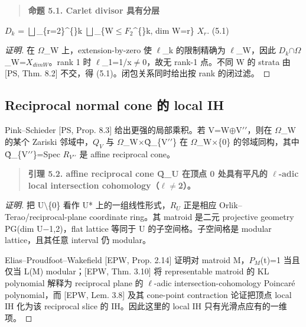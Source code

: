 \documentclass[11pt]{ctexart}
\begin{document}
\begin{quote}\textbf{命题 5.1. Carlet divisor 具有分层}\end{quote}

\ensuremath{D_{k}} = \ensuremath{\bigsqcup}\_\{r=2\}\textasciicircum\{\}k  \ensuremath{\bigsqcup}\_\{W\ensuremath{\le}\ensuremath{F_2}\textasciicircum\{\}k, dim W=r\} \ensuremath{X_{r}}.    (5.1)

\begin{proof}[证明] 

在 \ensuremath{\Omega}\_W 上，extension-by-zero 使 \ensuremath{\ell}\_k 的限制精确为 \ensuremath{\ell}\_W，因此 \ensuremath{D_{k}}\ensuremath{\cap}\ensuremath{\Omega}\_W=\ensuremath{X_{dim W}}。rank 1 时 \ensuremath{\ell}\_1=1/x\ensuremath{\ne}0，故无 rank-1 点。不同 W 的 strata 由 [PS, Thm. 8.2] 不交，得 (5.1)。闭包关系同时给出按 rank 的闭过滤。

\end{proof}

\subsection{Reciprocal normal cone 的 local IH}

Pink–Schieder [PS, Prop. 8.3] 给出更强的局部乘积。若 V=W\ensuremath{\oplus}V\ensuremath{\prime\prime}，则在 \ensuremath{\Omega}\_W 的某个 Zariski 邻域中，\ensuremath{Q_{V}} 与 \ensuremath{\Omega}\_W\ensuremath{\times}Q̃\_\{V\ensuremath{\prime\prime}\} 在 \ensuremath{\Omega}\_W\ensuremath{\times}\{0\} 的邻域同构，其中 Q̃\_\{V\ensuremath{\prime\prime}\}=Spec \ensuremath{R_{V\prime\prime}} 是 affine reciprocal cone。

\begin{quote}\textbf{引理 5.2. affine reciprocal cone Q̃\_U 在顶点 0 处具有平凡的 \ensuremath{\ell}-adic local intersection cohomology（\ensuremath{\ell}\ensuremath{\ne}2）。}\end{quote}

\begin{proof}[证明] 

把 U\ensuremath{\setminus}\{0\} 看作 U* 上的一组线性形式，\ensuremath{R_{U}} 正是相应 Orlik–Terao/reciprocal-plane coordinate ring。其 matroid 是二元 projective geometry PG(dim U−1,2)，flat lattice 等同于 U 的子空间格。子空间格是 modular lattice，且其任意 interval 仍 modular。

Elias–Proudfoot–Wakefield [EPW, Prop. 2.14] 证明对 matroid M，\ensuremath{P_{M}}(t)=1 当且仅当 L(M) modular；[EPW, Thm. 3.10] 将 representable matroid 的 KL polynomial 解释为 reciprocal plane 的 \ensuremath{\ell}-adic intersection-cohomology Poincaré polynomial，而 [EPW, Lem. 3.8] 及其 cone-point contraction 论证把顶点 local IH 化为该 reciprocal slice 的 IH。因此这里的 local IH 只有光滑点应有的一维项。

\end{proof}
\end{document}
